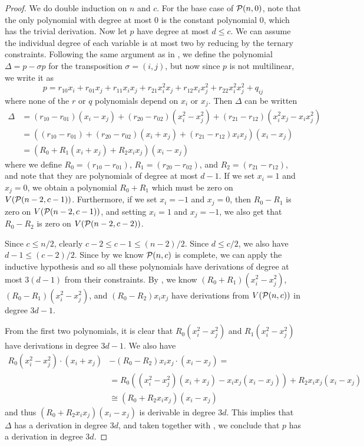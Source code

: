 \begin{proof}
We do double induction on $n$ and $c$. For the base case of $\mathcal P(n,0)$, note that the only polynomial with degree at most $0$ is the constant polynomial $0$, which has the trivial derivation. Now let $p$ have degree at most $d \leq c$. We can assume the individual degree of each variable is at most two by reducing by the ternary constraints. Following the same argument as in , we define the polynomial $\Delta = p - \sigma p$ for the transposition $\sigma = (i,j)$, but now since $p$ is not multilinear, we write it as 
\[p = r_{10}x_i + r_{01}x_j + r_{11}x_ix_j + r_{21}x_i^2x_j + r_{12}x_ix_j^2 + r_{22}x_i^2x_j^2 + q_{ij}\]
where none of the $r$ or $q$ polynomials depend on $x_i$ or $x_j$. Then $\Delta$ can be written
\begin{align*}
\Delta &= (r_{10} - r_{01})(x_i - x_j) + (r_{20} - r_{02})(x_i^2 - x_j^2) + (r_{21} - r_{12})(x_i^2x_j - x_ix_j^2) \\
&= ((r_{10} - r_{01}) + (r_{20} - r_{02})(x_i+x_j) + (r_{21} - r_{12})x_ix_j)(x_i - x_j) \\
&= (R_0 + R_1(x_i + x_j) + R_2x_ix_j)(x_i - x_j)
\end{align*}
where we define $R_0 = (r_{10} - r_{01})$, $R_1 = (r_{20} - r_{02})$, and $R_2 = (r_{21} - r_{12})$, and note that they are polynomials of degree at most $d-1$. If we set $x_i = 1$ and $x_j = 0$, we obtain a polynomial $R_0 + R_1$ which must be zero on $V(\mathcal P(n-2,c-1))$. Furthermore, if we set $x_i = -1$ and $x_j = 0$, then $R_0 - R_1$ is zero on $V(\mathcal P(n-2,c-1))$, and setting $x_i = 1$ and $x_j = -1$, we also get that $R_0 - R_2$ is zero on $V(\mathcal P(n-2,c-2))$. 

Since $c \leq n/2$, clearly $c-2 \leq c-1 \leq (n-2)/2$. Since $d \leq c/2$, we also have $d-1 \leq (c-2)/2$. Since by  we know $\mathcal P(n,c)$ is complete, we can apply the inductive hypothesis and so all these polynomials have derivations of degree at most $3(d-1)$ from their constraints. By , we know $(R_0+R_1)(x_i^2-x_j^2)$, $(R_0 - R_1)(x_i^2-x_j^2)$, and $(R_0 - R_2)x_ix_j$ have derivations from $V(\mathcal P(n,c))$ in degree $3d-1$.

From the first two polynomials, it is clear that $R_0(x_i^2-x_j^2)$ and $R_1(x_i^2-x_j^2)$ have derivations in degree $3d-1$. We also have
\begin{align*}
R_0(x_i^2-x_j^2) \cdot (x_i+x_j) &- (R_0 - R_2)x_ix_j \cdot (x_i - x_j) = \\&= R_0((x_i^2 - x_j^2)(x_i+x_j) - x_ix_j(x_i - x_j)) + R_2x_ix_j(x_i - x_j) \\
&\cong (R_0 + R_2x_ix_j)(x_i - x_j)
\end{align*}
and thus $(R_0 + R_2x_ix_j)(x_i - x_j)$ is derivable in degree $3d$. This implies that $\Delta$ has a derivation in degree $3d$, and taken together with , we conclude that $p$ has a derivation in degree $3d$. 
\end{proof}


